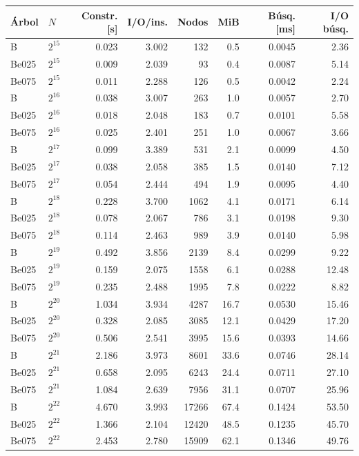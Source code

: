 \begin{tabular}{llrrrrrr}
\hline
Árbol & $N$ & Constr. [s] & I/O/ins. & Nodos & MiB & Búsq. [ms] & I/O búsq. \\
\hline
B & $2^{15}$ & 0.023 & 3.002 & 132 & 0.5 & 0.0045 & 2.36 \\
Be025 & $2^{15}$ & 0.009 & 2.039 & 93 & 0.4 & 0.0087 & 5.14 \\
Be075 & $2^{15}$ & 0.011 & 2.288 & 126 & 0.5 & 0.0042 & 2.24 \\
B & $2^{16}$ & 0.038 & 3.007 & 263 & 1.0 & 0.0057 & 2.70 \\
Be025 & $2^{16}$ & 0.018 & 2.048 & 183 & 0.7 & 0.0101 & 5.58 \\
Be075 & $2^{16}$ & 0.025 & 2.401 & 251 & 1.0 & 0.0067 & 3.66 \\
B & $2^{17}$ & 0.099 & 3.389 & 531 & 2.1 & 0.0099 & 4.50 \\
Be025 & $2^{17}$ & 0.038 & 2.058 & 385 & 1.5 & 0.0140 & 7.12 \\
Be075 & $2^{17}$ & 0.054 & 2.444 & 494 & 1.9 & 0.0095 & 4.40 \\
B & $2^{18}$ & 0.228 & 3.700 & 1062 & 4.1 & 0.0171 & 6.14 \\
Be025 & $2^{18}$ & 0.078 & 2.067 & 786 & 3.1 & 0.0198 & 9.30 \\
Be075 & $2^{18}$ & 0.114 & 2.463 & 989 & 3.9 & 0.0140 & 5.98 \\
B & $2^{19}$ & 0.492 & 3.856 & 2139 & 8.4 & 0.0299 & 9.22 \\
Be025 & $2^{19}$ & 0.159 & 2.075 & 1558 & 6.1 & 0.0288 & 12.48 \\
Be075 & $2^{19}$ & 0.235 & 2.488 & 1995 & 7.8 & 0.0222 & 8.82 \\
B & $2^{20}$ & 1.034 & 3.934 & 4287 & 16.7 & 0.0530 & 15.46 \\
Be025 & $2^{20}$ & 0.328 & 2.085 & 3085 & 12.1 & 0.0429 & 17.20 \\
Be075 & $2^{20}$ & 0.506 & 2.541 & 3995 & 15.6 & 0.0393 & 14.66 \\
B & $2^{21}$ & 2.186 & 3.973 & 8601 & 33.6 & 0.0746 & 28.14 \\
Be025 & $2^{21}$ & 0.658 & 2.095 & 6243 & 24.4 & 0.0711 & 27.10 \\
Be075 & $2^{21}$ & 1.084 & 2.639 & 7956 & 31.1 & 0.0707 & 25.96 \\
B & $2^{22}$ & 4.670 & 3.993 & 17266 & 67.4 & 0.1424 & 53.50 \\
Be025 & $2^{22}$ & 1.366 & 2.104 & 12420 & 48.5 & 0.1235 & 45.70 \\
Be075 & $2^{22}$ & 2.453 & 2.780 & 15909 & 62.1 & 0.1346 & 49.76 \\

\end{tabular}
